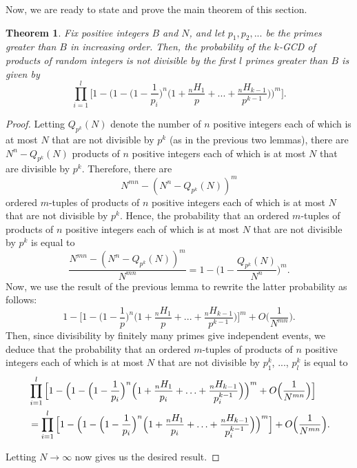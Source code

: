 \documentclass[10pt,a4paper]{article}
\newtheorem{theorem}{Theorem}[section]
\theoremstyle{definition}
\theoremstyle{remark}
\begin{document}
Now, we are ready to state and prove the main theorem of this section.

\begin{theorem}
Fix positive integers $B$ and $N$, and let $p_1, p_2, ...$ be the primes greater than $B$ in increasing order. Then, the probability of the $k$-GCD of products of random integers is not divisible by the first $l$ primes greater than $B$ is given by 
$$\prod_{i=1}^{l} \Big[1 - \Big(1 - \Big(1-\frac{1}{p_i}\Big)^n \Big(1 + \frac{{}_nH_1}{p} + ... + \frac{{}_nH_{k-1}}{p^{k-1}}\Big)\Big)^m\Big].$$
\end{theorem}

\begin{proof}
Letting $Q_{p^k}(N)$ denote the number of $n$ positive integers each of which is at most $N$ that are not divisible by $p^k$ (as in the previous two lemmas), there are $N^n - Q_{p^k}(N)$ products of $n$ positive integers each of which is at most $N$ that are divisible by $p^k$. Therefore, there are 
$$N^{mn} - (N^n - Q_{p^k}(N))^m$$
ordered $m$-tuples of products of $n$ positive integers each of which is at most $N$ that are not divisible by $p^k$.
Hence, the probability that an ordered $m$-tuples of products of $n$ positive integers each of which is at most $N$ that are not divisible by $p^k$ is equal to
$$\frac{N^{mn} - (N^n - Q_{p^k}(N))^m}{N^{mn}} = 1 - \Big(1 - \frac{Q_{p^k}(N)}{N^n}\Big)^m.$$
Now, we use the result of the previous lemma to rewrite the latter probability as follows:
$$1 - \Big[1 - \Big(1 - \frac{1}{p}\Big)^n \Big(1 + \frac{{}_nH_1}{p} + ... + \frac{{}_nH_{k-1}}{p^{k-1}}\Big)\Big]^m + O\Big(\frac{1}{N^{mn}}\Big).$$
Then, since divisibility by finitely many primes give independent events, we deduce that the probability that an ordered $m$-tuples of products of $n$ positive integers each of which is at most $N$ that are not divisible by $p_1^k$, ..., $p_l^k$ is equal to
\begin{align*} &\prod_{i=1}^l \Big[1 - \Big(1 -\Big(1-\frac{1}{p_i}\Big)^n\Big(1+\frac{{}_nH_1}{p_i}+\mathellipsis+\frac{{}_nH_{k-1}}{p_i^{k-1}}\Big)\Big)^m +O\Big(\frac{1}{N^{mn}}\Big) \Big]\\
&=\prod_{i=1}^l \Big[1 - \Big(1 -\Big(1-\frac{1}{p_i}\Big)^n\Big(1+\frac{{}_nH_1}{p_i}+\mathellipsis+\frac{{}_nH_{k-1}}{p_i^{k-1}}\Big)\Big)^m\Big] + O\Big(\frac{1}{N^{mn}}\Big). \end{align*}

\noindent Letting $N \to \infty$ now gives us the desired result.
\end{proof}
\end{document}
